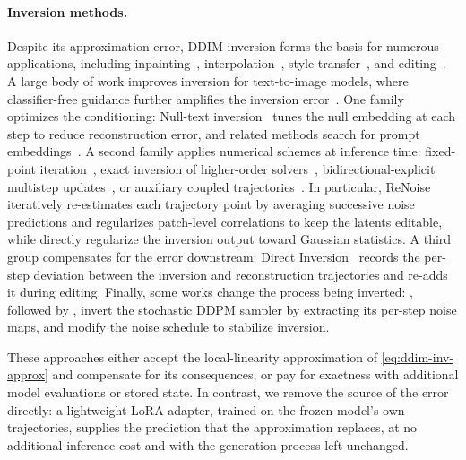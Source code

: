 \documentclass{article} %
\begin{document}
\paragraph{Inversion methods.}
Despite its approximation error, DDIM inversion forms the basis for numerous applications, including inpainting~\citep{DBLP:conf/icml/ZhangJZYJC23}, interpolation~\citep{dhariwal2021diffusion,zheng2024noisediffusion}, style transfer~\citep{}, and editing~\citep{su2022dual,Kim_2022_CVPR,hertz2022prompttoprompt,Ceylan_2023_ICCV,Deja2023}. A large body of work improves inversion for text-to-image models, where classifier-free guidance further amplifies the inversion error~\citep{Mokady_2023_CVPR,garibi2024renoise,huberman2024edit,meiri2023fixed,hong2024exact,miyake2023negativeprompt,han2024proxedit,dong2023prompt,NEURIPS2023_61960fdf,parmar2023zero,iterinv,wallace2023edict,Pan_2023_ICCV,wang2024belm0,brack2023ledits,lin2024schedule,ju2024pnp}. 
One family optimizes the conditioning: Null-text inversion~\citep{Mokady_2023_CVPR} tunes the null embedding at each step to reduce reconstruction error, and related methods search for prompt embeddings~\citep{miyake2023negativeprompt,han2024proxedit,dong2023prompt}. 
A second family applies numerical schemes at inference time: fixed-point iteration~\citep{meiri2023fixed,Pan_2023_ICCV}, exact inversion of higher-order solvers~\citep{hong2024exact}, bidirectional-explicit multistep updates~\citep{wang2024belm0}, or auxiliary coupled trajectories~\citep{wallace2023edict}. In particular, ReNoise~\citep{garibi2024renoise} iteratively re-estimates each trajectory point by averaging successive noise predictions and regularizes patch-level correlations to keep the latents editable, while \citet{parmar2023zero} directly regularize the inversion output toward Gaussian statistics. 
A third group compensates for the error downstream: Direct Inversion~\citep{ju2024pnp} records the per-step deviation between the inversion and reconstruction trajectories and re-adds it during editing. 
Finally, some works change the process being inverted: \citet{huberman2024edit}, followed by \citet{brack2023ledits}, invert the stochastic DDPM sampler by extracting its per-step noise maps, 
\citet{staniszewski2026there} and \citet{lin2024schedule} modify the noise schedule to stabilize inversion. 

These approaches either accept the local-linearity approximation of \eqref{eq:ddim-inv-approx} and compensate for its consequences, or pay for exactness with additional model evaluations or stored state. In contrast, we remove the source of the error directly: a lightweight LoRA adapter, trained on the frozen model's own trajectories, supplies the prediction that the approximation replaces, at no additional inference cost and with the generation process left unchanged.
\end{document}
